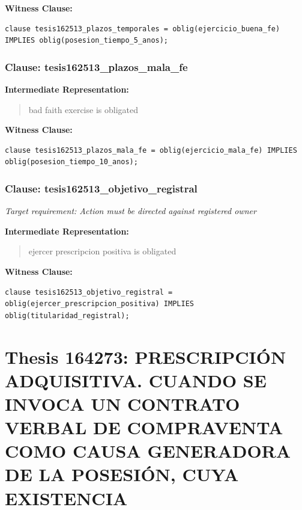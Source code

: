 \documentclass[11pt,a4paper]{article}
\begin{document}
\textbf{Witness Clause:}

\begin{lstlisting}[style=witnessstyle, language=Witness]
clause tesis162513_plazos_temporales = oblig(ejercicio_buena_fe) IMPLIES oblig(posesion_tiempo_5_anos);
\end{lstlisting}

\subsubsection{Clause: tesis162513\_plazos\_mala\_fe}

\textbf{Intermediate Representation:}

\begin{quote}
bad faith exercise is obligated
\end{quote}

\textbf{Witness Clause:}

\begin{lstlisting}[style=witnessstyle, language=Witness]
clause tesis162513_plazos_mala_fe = oblig(ejercicio_mala_fe) IMPLIES oblig(posesion_tiempo_10_anos);
\end{lstlisting}

\subsubsection{Clause: tesis162513\_objetivo\_registral}

\textit{Target requirement: Action must be directed against registered owner}

\textbf{Intermediate Representation:}

\begin{quote}
ejercer prescripcion positiva is obligated
\end{quote}

\textbf{Witness Clause:}

\begin{lstlisting}[style=witnessstyle, language=Witness]
clause tesis162513_objetivo_registral = oblig(ejercer_prescripcion_positiva) IMPLIES oblig(titularidad_registral);
\end{lstlisting}

\newpage

\section{Thesis 164273: PRESCRIPCIÓN ADQUISITIVA. CUANDO SE INVOCA UN CONTRATO VERBAL DE COMPRAVENTA COMO CAUSA GENERADORA DE LA POSESIÓN, CUYA EXISTENCIA}
\label{thesis:164273}
\end{document}
